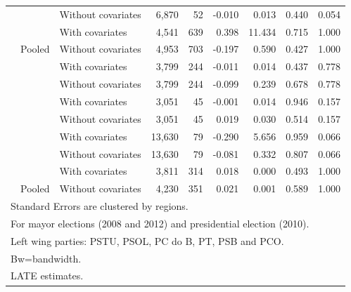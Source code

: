 \documentclass[
  12pt,
]{article}
\begin{document}
\begin{table}[H]
\begin{tabular}[t]{lllrrrrrr}
 & \multirow{-2}{*}{\raggedright\arraybackslash 60000} & Without covariates & 6,870 & 52 & -0.010 & 0.013 & 0.440 & 0.054\\


 &  & With covariates & 4,541 & 639 & 0.398 & 11.434 & 0.715 & 1.000\\


\multirow{-8}{*}{\raggedright\arraybackslash 2010} & Pooled & Without covariates & 4,953 & 703 & -0.197 & 0.590 & 0.427 & 1.000\\
\cmidrule{1-9}
 &  & With covariates & 3,799 & 244 & -0.011 & 0.014 & 0.437 & 0.778\\


 & \multirow{-2}{*}{\raggedright\arraybackslash 20000} & Without covariates & 3,799 & 244 & -0.099 & 0.239 & 0.678 & 0.778\\


 &  & With covariates & 3,051 & 45 & -0.001 & 0.014 & 0.946 & 0.157\\


 & \multirow{-2}{*}{\raggedright\arraybackslash 40000} & Without covariates & 3,051 & 45 & 0.019 & 0.030 & 0.514 & 0.157\\


 &  & With covariates & 13,630 & 79 & -0.290 & 5.656 & 0.959 & 0.066\\


 & \multirow{-2}{*}{\raggedright\arraybackslash 60000} & Without covariates & 13,630 & 79 & -0.081 & 0.332 & 0.807 & 0.066\\


 &  & With covariates & 3,811 & 314 & 0.018 & 0.000 & 0.493 & 1.000\\


\multirow{-8}{*}{\raggedright\arraybackslash 2012} & Pooled & Without covariates & 4,230 & 351 & 0.021 & 0.001 & 0.589 & 1.000\\
\bottomrule
\multicolumn{9}{l}{Standard Errors are clustered by regions.}\\
\multicolumn{9}{l}{For mayor elections (2008 and 2012) and presidential election (2010).}\\
\multicolumn{9}{l}{Left wing parties: PSTU, PSOL, PC do B, PT, PSB and PCO.}\\
\multicolumn{9}{l}{Bw=bandwidth.}\\
\multicolumn{9}{l}{LATE estimates.}\\
\end{tabular}
\end{table}
\end{document}
